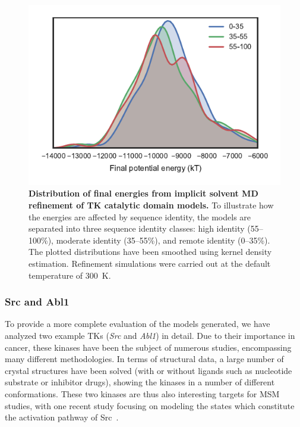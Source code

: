 \documentclass[aps,prl,preprint,nofootinbib,superscriptaddress,linenumbers]{revtex4-1}
\begin{document}
\begin{figure}[tbp]
    \includegraphics[width=0.6\columnwidth]{energies/energies.pdf}

    \caption{\footnotesize {\bf Distribution of final energies from implicit solvent MD refinement of TK catalytic domain models.}
    To illustrate how the energies are affected by sequence identity, the models are separated into three sequence identity classes: high identity (55--100\%), moderate identity (35--55\%), and remote identity (0--35\%).
    The plotted distributions have been smoothed using kernel density estimation.
    Refinement simulations were carried out at the default temperature of 300~K.
  }
  \label{figure:energies-implicit}
\end{figure}


\subsubsection*{Src and Abl1}

To provide a more complete evaluation of the models generated, we have analyzed two example TKs (\emph{Src} and \emph{Abl1}) in detail.
Due to their importance in cancer, these kinases have been the subject of numerous studies, encompassing many different methodologies.
In terms of structural data, a large number of crystal structures have been solved (with or without ligands such as nucleotide substrate or inhibitor drugs), showing the kinases in a number of different conformations.
These two kinases are thus also interesting targets for MSM studies, with one recent study focusing on modeling the states which constitute the activation pathway of Src~\cite{shukla-pande:nature-commun:2014:src-activation-msm}.

\end{document}

